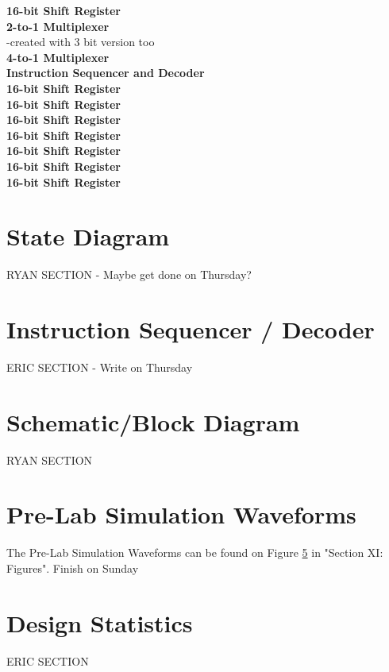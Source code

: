 \documentclass[journal, twocolumn, final,11pt,letterpaper]{IEEEtran}
\begin{document}
\normalsize\textbf{16-bit Shift Register} \\

\normalsize\textbf{2-to-1 Multiplexer} \\
-created with 3 bit version too\\

\normalsize\textbf{4-to-1 Multiplexer} \\
\normalsize\textbf{Instruction Sequencer and Decoder } \\
\normalsize\textbf{16-bit Shift Register} \\
\normalsize\textbf{16-bit Shift Register} \\
\normalsize\textbf{16-bit Shift Register} \\
\normalsize\textbf{16-bit Shift Register} \\
\normalsize\textbf{16-bit Shift Register} \\
\normalsize\textbf{16-bit Shift Register} \\
\normalsize\textbf{16-bit Shift Register} \\



\section{State Diagram}
RYAN SECTION - Maybe get done on Thursday?

\section{Instruction Sequencer / Decoder}
ERIC SECTION - Write on Thursday

\section{Schematic/Block Diagram}
RYAN SECTION

\section{Pre-Lab Simulation Waveforms}
The Pre-Lab Simulation Waveforms can be found on Figure \ref{} in "Section XI: Figures". Finish on Sunday

\section{Design Statistics}
ERIC SECTION
\end{document}
